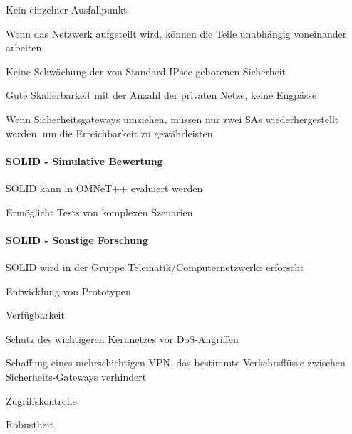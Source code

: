 \documentclass[a4paper]{article}
\begin{document}
\begin{multicols}{3}
\begin{itemize*}
\begin{itemize*}
                  \begin{itemize*}
                        \item Kein einzelner Ausfallpunkt
                        \item Wenn das Netzwerk aufgeteilt wird, können die Teile unabhängig voneinander arbeiten
                  \end{itemize*}
                  \item
                  Keine Schwächung der von Standard-IPsec gebotenen Sicherheit
                  \item
                  Gute Skalierbarkeit mit der Anzahl der privaten Netze, keine Engpässe
                  \item
                  Wenn Sicherheitsgateways umziehen, müssen nur zwei SAs
                  wiederhergestellt werden, um die Erreichbarkeit zu gewährleisten
            \end{itemize*}


            \paragraph{SOLID - Simulative
                  Bewertung}

            \begin{itemize*}
                  \item
                  SOLID kann in OMNeT++ evaluiert werden
                  \item
                  Ermöglicht Tests von komplexen Szenarien
            \end{itemize*}


            \paragraph{SOLID - Sonstige
                  Forschung}

            \begin{itemize*}
                  \item
                  SOLID wird in der Gruppe Telematik/Computernetzwerke erforscht
                  \item
                  Entwicklung von Prototypen
                  \item
                  Verfügbarkeit

                  \begin{itemize*}
                        \item Schutz des wichtigeren Kernnetzes vor DoS-Angriffen
                        \item Schaffung eines mehrschichtigen VPN, das bestimmte Verkehrsflüsse zwischen Sicherheits-Gateways verhindert
                  \end{itemize*}
                  \item
                  Zugriffskontrolle
                  \item
                  Robustheit


\end{itemize*}
\end{itemize*}
\end{multicols}
\end{document}
